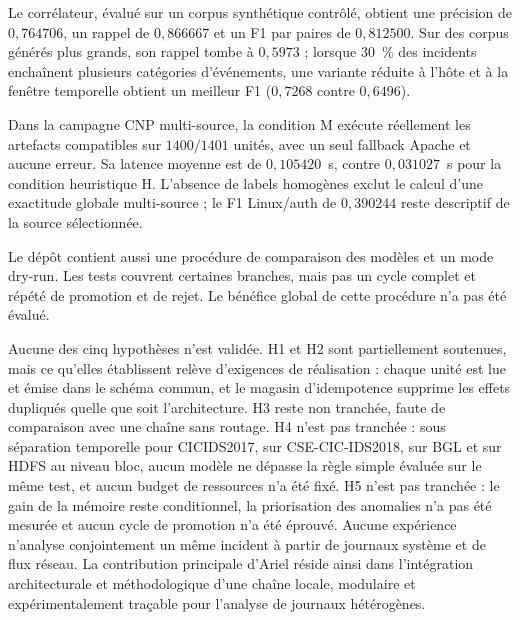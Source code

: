 Le corrélateur, évalué sur un corpus synthétique contrôlé, obtient une
précision de $0{,}764706$, un rappel de $0{,}866667$ et un F1 par paires de
$0{,}812500$. Sur des corpus générés plus grands, son rappel tombe à
$0{,}5973$ ; lorsque 30~\% des incidents enchaînent plusieurs catégories
d'événements, une variante réduite à l'hôte et à la fenêtre temporelle obtient
un meilleur F1 ($0{,}7268$ contre $0{,}6496$).

Dans la campagne CNP multi-source, la condition M exécute réellement les
artefacts compatibles sur $1400/1401$ unités, avec un seul fallback Apache et
aucune erreur. Sa latence moyenne est de $0{,}105420$~s, contre $0{,}031027$~s
pour la condition heuristique H. L'absence de labels homogènes exclut le
calcul d'une exactitude globale multi-source ; le F1 Linux/auth de
$0{,}390244$ reste descriptif de la source sélectionnée.

Le dépôt contient aussi une procédure de comparaison des modèles et un mode
dry-run. Les tests couvrent certaines branches, mais pas un cycle complet et
répété de promotion et de rejet. Le bénéfice global de cette procédure n'a pas
été évalué.

Aucune des cinq hypothèses n'est validée. H1 et H2 sont partiellement
soutenues, mais ce qu'elles établissent relève d'exigences de réalisation :
chaque unité est lue et émise dans le schéma commun, et le magasin
d'idempotence supprime les effets dupliqués quelle que soit l'architecture.
H3 reste non tranchée, faute de comparaison avec une chaîne sans routage. H4
n'est pas tranchée : sous séparation temporelle pour CICIDS2017, sur CSE-CIC-IDS2018, sur BGL et sur HDFS au niveau bloc, aucun modèle ne dépasse la règle simple évaluée sur le même test, et aucun budget de ressources n'a été fixé. H5 n'est pas tranchée : le gain de la mémoire reste conditionnel, la priorisation des anomalies n'a pas été mesurée et aucun cycle de promotion n'a été éprouvé. Aucune expérience n'analyse
conjointement un même incident à partir de journaux système et de flux
réseau. La contribution principale d'Ariel \logminer{} réside ainsi dans
l'intégration architecturale et méthodologique d'une chaîne locale, modulaire
et expérimentalement traçable pour l'analyse de journaux hétérogènes.
